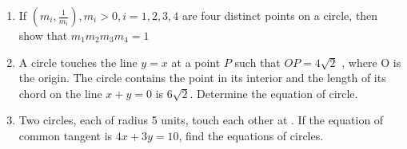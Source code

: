 \documentclass[journal,12pt,twocolumn]{IEEEtran}
\theoremstyle{remark}
\begin{document}
\begin{enumerate}
\hfill {}
\item If $\left( m_i, \frac{1}{m_i} \right), m_i > 0, i = 1, 2, 3, 4$ are four distinct points on a circle, then show that $m_1m_2m_3m_4=1$

\hfill {}
\item A circle touches the line $y=x$ at a point $\textit{P}$ such that $OP=4\sqrt{2}$ , where O is the origin. The circle contains the point  in its interior and the length of its chord on the line $x+y=0$ is $6\sqrt{2}$. Determine the equation of circle.

\hfill {}
\item Two circles, each of radius 5 units, touch each other at . If the equation of common tangent is $4x+3y=10$, find the equations of circles.

\hfill {}
\end{enumerate}
\end{document}
